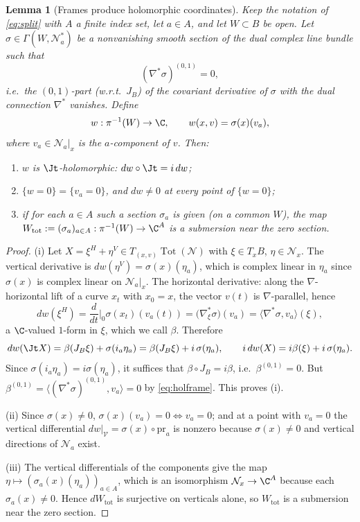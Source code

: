 \documentclass[11pt]{amsart}
\theoremstyle{plain}
\newtheorem{lemma}[theorem]{Lemma}
\theoremstyle{definition}
\newcommand{\NN}{\mathcal{N}}
\newcommand{\tot}{\operatorname{Tot}}
\begin{document}
\begin{lemma}[Frames produce holomorphic coordinates]\label{lem:frames}
Keep the notation of \eqref{eq:split} with $A$ a finite index set, let
$a\in A$, and let $W\subset B$ be open. Let
$\sigma\in\Gamma(W,\NN_a^{*})$ be a nonvanishing smooth section of the dual
complex line bundle such that
\begin{equation}\label{eq:holframe}
 (\nabla^{*}\sigma)^{(0,1)}=0 ,
\end{equation}
i.e.\ the $(0,1)$-part (w.r.t.\ $J_B$) of the covariant derivative of
$\sigma$ with the dual connection $\nabla^*$ vanishes. Define
\[
 w:\pi^{-1}(W)\to\C,\qquad w(x,v)=\sigma(x)(v_a),
\]
where $v_a\in\NN_a|_x$ is the $a$-component of $v$. Then:
\begin{enumerate}
\item[(i)] $w$ is $\Jt$-holomorphic: $dw\circ\Jt=i\,dw$;
\item[(ii)] $\{w=0\}=\{v_a=0\}$, and $dw\neq0$ at every point of $\{w=0\}$;
\item[(iii)] if for each $a\in A$ such a section $\sigma_a$ is given (on a
common $W$), the map $W_{\mathrm{tot}}:=(\sigma_a)_{a\in A}:\pi^{-1}(W)\to\C^A$
is a submersion near the zero section.
\end{enumerate}
\end{lemma}

\begin{proof}
(i) Let $X=\xi^H+\eta^V\in T_{(x,v)}\tot(\NN)$ with $\xi\in T_xB$,
$\eta\in\NN_x$. The vertical derivative is
$dw(\eta^V)=\sigma(x)(\eta_a)$, which is complex linear in $\eta_a$ since
$\sigma(x)$ is complex linear on $\NN_a|_x$. The horizontal derivative: along
the $\nabla$-horizontal lift of a curve $x_t$ with $x_0=x$, the vector
$v(t)$ is $\nabla$-parallel, hence
\[
dw(\xi^H)=\frac{d}{dt}\Big|_{0}\sigma(x_t)(v_a(t))
=\bigl(\nabla^*_{\xi}\sigma\bigr)(v_a)
=\big\langle\nabla^*\sigma,v_a\big\rangle(\xi),
\]
a $\C$-valued $1$-form in $\xi$, which we call $\beta$. Therefore
\[
dw(\Jt X)=\beta(J_B\xi)+\sigma(i_a\eta_a)=\beta(J_B\xi)+i\,\sigma(\eta_a),
\qquad
i\,dw(X)=i\beta(\xi)+i\,\sigma(\eta_a).
\]
Since $\sigma(i_a\eta_a)=i\sigma(\eta_a)$, it suffices that
$\beta\circ J_B=i\beta$, i.e.\ $\beta^{(0,1)}=0$. But
$\beta^{(0,1)}=\big\langle(\nabla^*\sigma)^{(0,1)},v_a\big\rangle=0$
by \eqref{eq:holframe}. This proves (i).

(ii) Since $\sigma(x)\neq0$, $\sigma(x)(v_a)=0\iff v_a=0$; and at a point
with $v_a=0$ the vertical differential $dw|_{\mathcal V}=\sigma(x)\circ
\mathrm{pr}_a$ is nonzero because $\sigma(x)\neq0$ and vertical directions of
$\NN_a$ exist.

(iii) The vertical differentials of the components give the map
$\eta\mapsto(\sigma_a(x)(\eta_a))_{a\in A}$, which is an isomorphism
$\NN_x\to\C^A$ because each $\sigma_a(x)\neq0$. Hence
$dW_{\mathrm{tot}}$ is surjective on verticals alone, so $W_{\mathrm{tot}}$ is
a submersion near the zero section.
\end{proof}
\end{document}
